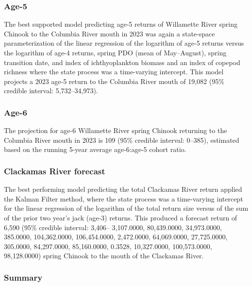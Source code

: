 \documentclass[12pt,]{article}
\begin{document}
\hypertarget{age-5}{%
\subsubsection{Age-5}\label{age-5}}

The best supported model predicting age-5 returns of Willamette River
spring Chinook to the Columbia River mouth in 2023 was again a
state-space parameterization of the linear regression of the logarithm
of age-5 returns versus the logarithm of age-4 returns, spring PDO (mean
of May--August), spring transition date, and index of ichthyoplankton
biomass and an index of copepod richness where the state process was a
time-varying intercept. This model projects a 2023 age-5 return to the
Columbia River mouth of 19,082 (95\% credible interval: 5,732--34,973).

\hypertarget{age-6}{%
\subsubsection{Age-6}\label{age-6}}

The projection for age-6 Willamette River spring Chinook returning to
the Columbia River mouth in 2023 is 109 (95\% credible interval:
0--385), estimated based on the running 5-year average age-6:age-5
cohort ratio.

\hypertarget{clackamas-river-forecast}{%
\subsubsection{Clackamas River
forecast}\label{clackamas-river-forecast}}

The best performing model predicting the total Clackamas River return
applied the Kalman Filter method, where the state process was a
time-varying intercept for the linear regression of the logarithm of the
total return size versus of the sum of the prior two year's jack (age-3)
returns. This produced a forecast return of 6,590 (95\% credible
interval: 3,406-- 3,107.0000, 80,439.0000, 34,973.0000, 385.0000,
104,362.0000, 106,454.0000, 2,472.0000, 64,069.0000, 27,725.0000,
305.0000, 84,297.0000, 85,160.0000, 0.3528, 10,327.0000, 100,573.0000,
98,128.0000) spring Chinook to the mouth of the Clackamas River.

\hypertarget{summary}{%
\subsubsection{Summary}\label{summary}}
\end{document}
